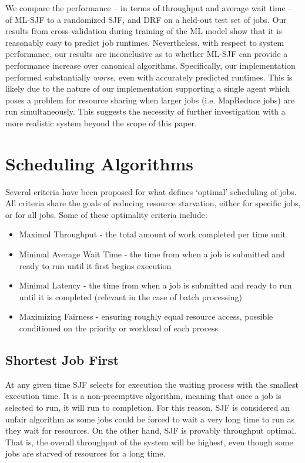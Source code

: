 \documentclass{hotnets19}
\begin{document}
We compare the performance -- in terms of throughput and average wait time -- of ML-SJF to a randomized SJF, and DRF on a held-out test set of jobs. Our results from cross-validation during training of the ML model show that it is reasonably easy to predict job runtimes. Nevertheless, with respect to system performance, our results are inconclusive as to whether ML-SJF can provide a performance increase over canonical algorithms. Specifically, our implementation performed substantially \emph{worse}, even with accurately predicted runtimes. This is likely due to the nature of our implementation supporting a single agent which poses a problem for resource sharing when larger jobs (i.e. MapReduce jobs) are run simultaneously. This suggests the necessity of further investigation with a more realistic system beyond the scope of this paper.

\section{Scheduling Algorithms}
Several criteria have been proposed for what defines `optimal' scheduling of jobs. All criteria share the goals of reducing resource starvation, either for specific jobs, or for all jobs.
Some of these optimality criteria include:
\begin{itemize}
    \item Maximal Throughput - the total amount of work completed per time unit
    \item Minimal Average Wait Time - the time from when a job is submitted and ready to run until it first begins execution
    \item Minimal Latency - the time from when a job is submitted and ready to run until it is completed (relevant in the case of batch processing)
    \item Maximizing Fairness - ensuring roughly equal resource access, possible conditioned on the priority or workload of each process
\end{itemize}

\subsection{Shortest Job First}

At any given time SJF selects for execution the waiting process with the smallest execution time.
It is a non-preemptive algorithm, meaning that once a job is selected to run, it will run to completion. For this reason, SJF is considered an unfair algorithm as some jobs could be forced to wait a very long time to run as they wait for resources. On the other hand, SJF is provably throughput optimal. That is, the overall throughput of the system will be highest, even though some jobs are starved of resources for a long time.
\end{document}
